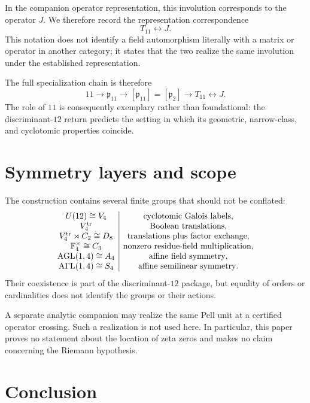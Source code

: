 \documentclass[11pt]{article}
\theoremstyle{definition}
\theoremstyle{remark}
\newcommand{\F}{\mathbb F}
\begin{document}
In the companion operator representation, this involution corresponds to the
operator $J$.  We therefore record the representation correspondence
\[
\boxed{T_{11}\longleftrightarrow J.}
\]
This notation does not identify a field automorphism literally with a matrix
or operator in another category; it states that the two realize the same
involution under the established representation.

The full specialization chain is therefore
\[
\boxed{
11
\longrightarrow
\mathfrak p_{11}
\longrightarrow
[\mathfrak p_{11}]=[\mathfrak p_2]
\longrightarrow
T_{11}
\longleftrightarrow
J.}
\]
The role of $11$ is consequently exemplary rather than foundational: the
discriminant-$12$ return predicts the setting in which its geometric,
narrow-class, and cyclotomic properties coincide.

\section{Symmetry layers and scope}

The construction contains several finite groups that should not be conflated:
\[
\begin{array}{c|c}
U(12)\cong V_4 & \text{cyclotomic Galois labels},\\
V_4^{\rm tr} & \text{Boolean translations},\\
V_4^{\rm tr}\rtimes C_2\cong D_8 & \text{translations plus factor exchange},\\
\F_4^\times\cong C_3 & \text{nonzero residue-field multiplication},\\
\operatorname{AGL}(1,4)\cong A_4 & \text{affine field symmetry},\\
\operatorname{A\Gamma L}(1,4)\cong S_4 & \text{affine semilinear symmetry}.
\end{array}
\]
Their coexistence is part of the discriminant-$12$ package, but equality of
orders or cardinalities does not identify the groups or their actions.

A separate analytic companion may realize the same Pell unit at a certified
operator crossing.  Such a realization is not used here.  In particular,
this paper proves no statement about the location of zeta zeros and makes no
claim concerning the Riemann hypothesis.

\section{Conclusion}
\end{document}
